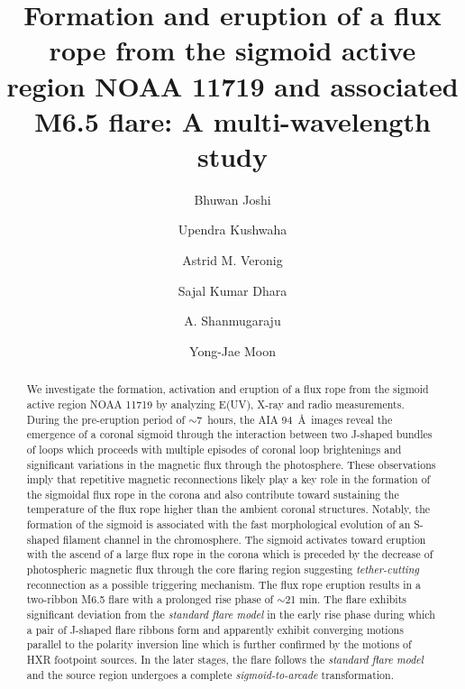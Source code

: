 \documentclass[twocolumn]{aastex6}
\begin{document}
\title{Formation and eruption of a flux rope from the sigmoid active region NOAA 11719 and associated M6.5 flare: A multi-wavelength study}

\author{Bhuwan Joshi}
\author{Upendra Kushwaha}


\author{Astrid M. Veronig}

\author{Sajal Kumar Dhara}

\author{A. Shanmugaraju}

\author{Yong-Jae Moon}

\begin{abstract}
We investigate the formation, activation and eruption of a flux rope from the sigmoid active region NOAA 11719 by analyzing E(UV), X-ray and radio measurements. During the pre-eruption period of $\sim$7~hours, the AIA 94~\AA~images reveal the emergence of a coronal sigmoid through the interaction between two J-shaped bundles of loops which proceeds with multiple episodes of coronal loop brightenings and significant variations in the magnetic flux through the photosphere. These observations imply that repetitive magnetic reconnections likely play a key role in the formation of the sigmoidal flux rope in the corona and also contribute toward sustaining the temperature of the flux rope higher than the ambient coronal structures. Notably, the formation of the sigmoid is associated with the fast morphological evolution of an S-shaped filament channel in the chromosphere. The sigmoid activates toward eruption with the ascend of a large flux rope in the corona which is preceded by the decrease of photospheric magnetic flux through the core flaring region suggesting {\it tether-cutting} reconnection as a possible triggering mechanism. The flux rope eruption results in a two-ribbon M6.5 flare with a prolonged rise phase of $\sim$21 min. The flare exhibits significant deviation from the {\it standard flare model} in the early rise phase during which a pair of J-shaped flare ribbons form and apparently exhibit converging motions parallel to the polarity inversion line which is further confirmed by the motions of HXR footpoint sources. In the later stages, the flare follows the {\it standard flare model} and the source region undergoes a complete {\it sigmoid-to-arcade} transformation.
\end{abstract}
\end{document}
